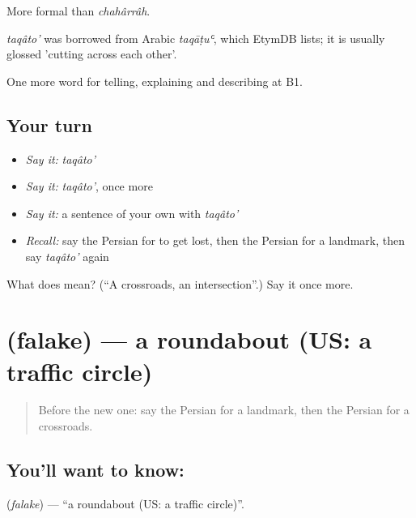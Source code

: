 More formal than \emph{chahârrâh}.

\begin{cousinweb}
\emph{taqâto'} was borrowed from Arabic \emph{taqāṭuʿ}, which EtymDB lists; it is usually glossed 'cutting across each other'.
\end{cousinweb}

\begin{grammarlens}[title={What you've built}]
One more word for telling, explaining and describing at B1.
\end{grammarlens}

\subsection*{Your turn}
\begin{itemize}
\raggedright
  \item \emph{Say it:} \emph{taqâto'}
  \item \emph{Say it:} \emph{taqâto'}, once more
  \item \emph{Say it:} a sentence of your own with \emph{taqâto'}
  \item \emph{Recall:} say the Persian for to get lost, then the Persian for a landmark, then say \emph{taqâto'} again
\end{itemize}

\begin{tcolorbox}[breakable,colback=teal!4,colframe=teal!35!black,title={Before you move on}]
What does  mean? (\textquotedblleft{}A crossroads, an intersection\textquotedblright{}.) Say it once more.
\end{tcolorbox}
\section[\texorpdfstring{\fa{فلکه} (falake)}{فلکه (falake)}]{ (falake) — a roundabout (US: a traffic circle)}

\label{lesson:FA-C445-falake}



\begin{quote}
Before the new one: say the Persian for a landmark, then the Persian for a crossroads.
\end{quote}

\subsection*{You'll want to know: }
\textbf{} (\emph{falake}) — \textquotedblleft{}a roundabout (US: a traffic circle)\textquotedblright{}.

